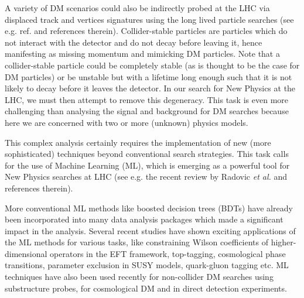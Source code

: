 \documentclass[prd,aps,letterpaper,floatfix,superscriptaddress,preprintnumbers,twocolumn,10pt,nofootinbib]{revtex4-1}
\begin{document}


A variety of DM scenarios could also be indirectly probed at the LHC via displaced track and vertices signatures using the long lived particle searches (see e.g. ref. \cite{No:2019gvl} and references therein). Collider-stable particles are particles which do not interact with the detector and do not decay before leaving it, hence manifesting as missing momentum and mimicking DM particles. Note that a collider-stable particle could be completely stable (as is thought to be the case for DM particles) or be unstable but with a lifetime long enough such that it is not likely to decay before it leaves the detector. In our search for New Physics at the LHC, we must then attempt to remove this degeneracy. This task is even more challenging than analysing the signal and background for DM searches because here we are concerned with two or more (unknown) physics models. 

This complex analysis certainly requires the implementation of new (more sophisticated) techniques beyond conventional search strategies. This task calls for the use of Machine Learning (ML), which is emerging as a powerful tool for  New Physics searches at LHC (see e.g. the recent review by Radovic {\it{et al.}} \cite{Radovic:2018dip} and references therein).

More conventional ML methods like boosted decision trees (BDTs) have already been incorporated into many data analysis packages which made a significant impact in the analysis.
Several recent studies have shown exciting applications of the ML methods for various tasks, like constraining Wilson coefficients of higher-dimensional operators in the EFT framework\cite{Brehmer:2018eca,Brehmer:2018kdj,Freitas:2019hbk}, top-tagging\cite{toptagger,manytagger}, cosmological phase transitions\cite{Piscopo:2019txs}, parameter exclusion in SUSY models\cite{Caron:2016hib}, quark-gluon tagging\cite{q-g-tagging} etc. ML techniques have also been used recently for non-collider DM searches using substructure probes\cite{Brehmer:2019jyt,Alexander:2019puy}, for cosmological DM\cite{cosmoDM} and in direct detection experiments\cite{Simola:2018ntn}.
\end{document}
